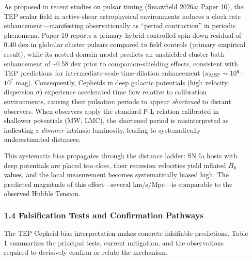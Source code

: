 \documentclass[
]{article}
\begin{document}
As proposed in recent studies on pulsar timing (Smawfield 2026a; Paper
10), the TEP scalar field in active-shear astrophysical environments
induces a clock rate enhancement---manifesting observationally as
``period contraction'' in periodic phenomena. Paper 10 reports a primary
hybrid-controlled spin-down residual of 0.40 dex in globular cluster
pulsars compared to field controls (primary empirical result), while its
nested-domain model predicts an unshielded cluster-bath enhancement of
\textasciitilde0.58 dex prior to companion-shielding effects, consistent
with TEP predictions for intermediate-scale time-dilation enhancement
(\(\kappa_{\rm MSP} \sim 10^6\)--\(10^7\) mag). Consequently, Cepheids
in deep galactic potentials (high velocity dispersion \(\sigma\))
experience accelerated time flow relative to calibration environments,
causing their pulsation periods to appear \emph{shortened} to distant
observers. When observers apply the standard P-L relation calibrated in
shallower potentials (MW, LMC), the shortened period is misinterpreted
as indicating a \emph{dimmer} intrinsic luminosity, leading to
systematically underestimated distances.

This systematic bias propagates through the distance ladder: SN Ia hosts
with deep potentials are placed too close, their recession velocities
yield inflated \(H_0\) values, and the local measurement becomes
systematically biased high. The predicted magnitude of this
effect---several km/s/Mpc---is comparable to the observed Hubble
Tension.

\subsubsection{1.4 Falsification Tests and Confirmation
Pathways}\label{falsification-tests-and-confirmation-pathways}

The TEP Cepheid-bias interpretation makes concrete falsifiable
predictions. Table 1 summarizes the principal tests, current mitigation,
and the observations required to decisively confirm or refute the
mechanism.
\end{document}
